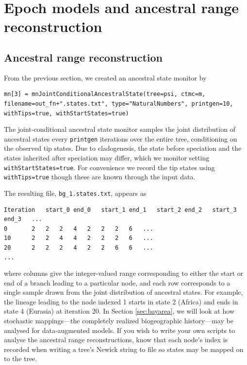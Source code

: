 \section{Epoch models and ancestral range reconstruction}

\subsection{Ancestral range reconstruction}


From the previous section, we created an ancestral state monitor by
\begin{snugshade}
\begin{lstlisting}
mn[3] = mnJointConditionalAncestralState(tree=psi, ctmc=m, filename=out_fn+".states.txt", type="NaturalNumbers", printgen=10, withTips=true, withStartStates=true)
\end{lstlisting}
\end{snugshade}

The joint-conditional ancestral state monitor samples the joint distribution of ancestral states every {\tt printgen} iterations over the entire tree, conditioning on the observed tip states.
Due to cladogenesis, the state before speciation and the states inherited after speciation may differ, which we monitor setting {\tt withStartStates=true}.
For convenience we record the tip states using {\tt withTips=true} though these are known through the input data.

The resulting file, {\tt bg\_1.states.txt}, appears as

\begin{framed}
\begin{lstlisting}
Iteration	start_0	end_0	start_1	end_1	start_2	end_2	start_3	end_3	...
0		2	2	2	4	2	2	2	6	...
10		2	2	4	4	2	2	2	6	...
20		2	2	2	4	2	2	6	6	...
...
\end{lstlisting}
\end{framed}

where columns give the integer-valued range corresponding to either the start or end of a branch leading to a particular node, and each row corresponds to a single sample drawn from the joint distribution of ancestral states.
For example, the lineage leading to the node indexed 1 starts in state 2 (Africa) and ends in state 4 (Eurasia) at iteration 20.
In Section \ref{sec:bayarea}, we will look at how stochastic mappings---the completely realized biogeographic history---may be analysed for data-augmented models.
If you wish to write your own scripts to analyse the ancestral range reconstructions, know that each node's index is recorded when writing a tree's Newick string to file so states may be mapped on to the tree.

